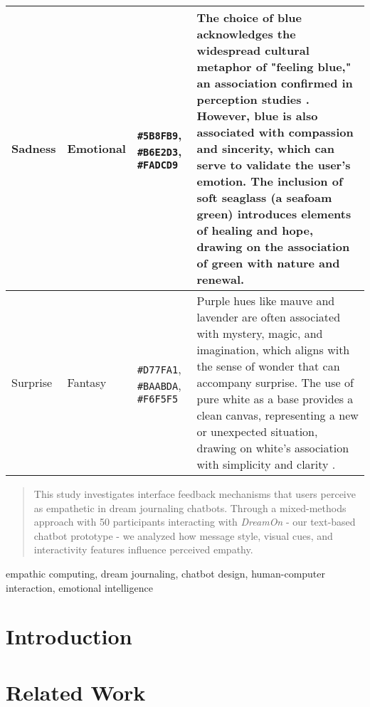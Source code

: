 \documentclass[conference]{IEEEtran}
\begin{document}
\begin{table*}[t]
\begin{tabular}{|p{}|p{}|p{}|p{}|}
			\hline
			Sadness & Emotional & \cellcolor{sadnessPrimary}\texttt{\#5B8FB9}, \cellcolor{sadnessSecondary}\texttt{\#B6E2D3}, \cellcolor{sadnessAccent}\texttt{\#FADCD9} & The choice of blue acknowledges the widespread cultural metaphor of "feeling blue," an association confirmed in perception studies \cite{b7}. However, blue is also associated with compassion and sincerity, which can serve to validate the user's emotion. The inclusion of soft seaglass (a seafoam green) introduces elements of healing and hope, drawing on the association of green with nature and renewal. \\
			\hline
			Surprise & Fantasy & \cellcolor{surprisePrimary}\texttt{\#D77FA1}, \cellcolor{surpriseSecondary}\texttt{\#BAABDA}, \cellcolor{surpriseAccent}\texttt{\#F6F5F5} & Purple hues like mauve and lavender are often associated with mystery, magic, and imagination, which aligns with the sense of wonder that can accompany surprise. The use of pure white as a base provides a clean canvas, representing a new or unexpected situation, drawing on white's association with simplicity and clarity \cite{b6}. \\
			\hline
		\end{tabular}
	\end{table*}
	
	\begin{abstract}
		This study investigates interface feedback mechanisms that users perceive as empathetic in dream journaling chatbots. Through a mixed-methods approach with 50 participants interacting with \textit{DreamOn} - our text-based chatbot prototype - we analyzed how message style, visual cues, and interactivity features influence perceived empathy.
	\end{abstract}
	
	\begin{IEEEkeywords}
		empathic computing, dream journaling, chatbot design, human-computer interaction, emotional intelligence
	\end{IEEEkeywords}
	
	\section{Introduction}
	
	\section{Related Work}
\end{document}
